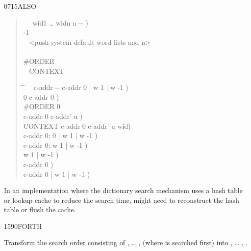 \begin{worddef}{0715}{ALSO}
\begin{defer}
\begin{quote}
		\word{:} ~~ wid1 {\ldots} widn n -{}- ) \\
		\tab {} -1 \word{=}  \\
		\tab~  <push system default word lists and n> \\
		\tab {} \\
		\tab {} \#ORDER \word{!} \\
		  ~
			  CONTEXT \word{+} \word{!}
		 \\
		\word{;}

		\begin{tabbing}
		\tab \= \tab \= \tab \= \hspace{10.5em} \= \kill
		\+ \word{:} ~  c-addr -{}- c-addr 0 | w 1 | w -1 ) \\
				0												\>\>\>  c-addr 0 ) \\
			\+	\#ORDER  0  \\
				 						\>\>  c-addr 0 c-addr' u ) \\
				  CONTEXT \word{+} 	\>\>  c-addr 0 c-addr' u wid) \\
									\>\>  c-addr 0; 0 | w 1 | w -1 ) \\
				 							\>\> \word{p} c-addr 0; w 1 | w -1 ) \\
				\>   		\>	  w 1 | w -1 ) \\
			\-											\>\>  c-addr 0 ) \\
		\-												\>\>\>  c-addr 0 | w 1 | w -1 ) \\
		\word{;}
		\end{tabbing}
		\end{quote}

		In an implementation where the dictionary search mechanism
		uses a hash table or lookup cache to reduce the search time,
		 might need to reconstruct the hash table or
		flush the cache.
	\end{defer}
\end{worddef}


\begin{worddef}{1590}{FORTH}
\item \stack{}{}

	Transform the search order consisting of , {\ldots}
	,  (where  is searched
	first) into , {\ldots} ,
	.
\end{worddef}


